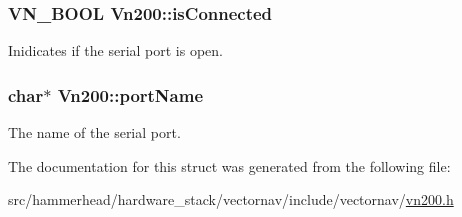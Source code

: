 \subsubsection[{\texorpdfstring{is\+Connected}{isConnected}}]{\setlength{\rightskip}{0pt plus 5cm}V\+N\+\_\+\+B\+O\+OL Vn200\+::is\+Connected}\hypertarget{structVn200_aa6d2a99cef4b62e9ab36a9efa1eeb34a}{}\label{structVn200_aa6d2a99cef4b62e9ab36a9efa1eeb34a}
Inidicates if the serial port is open. 
\subsubsection[{\texorpdfstring{port\+Name}{portName}}]{\setlength{\rightskip}{0pt plus 5cm}char$\ast$ Vn200\+::port\+Name}\hypertarget{structVn200_a1551fb183b0cbdde3d4ba81d60fd8a89}{}\label{structVn200_a1551fb183b0cbdde3d4ba81d60fd8a89}
The name of the serial port. 

The documentation for this struct was generated from the following file\+:\begin{DoxyCompactItemize}
\item 
src/hammerhead/hardware\+\_\+stack/vectornav/include/vectornav/\hyperlink{vn200_8h}{vn200.\+h}\end{DoxyCompactItemize}

